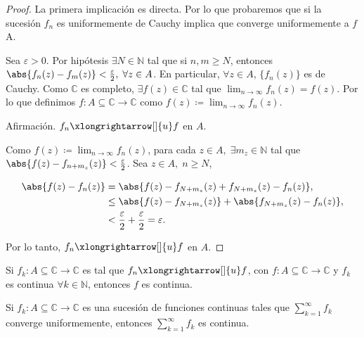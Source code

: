 \documentclass[../main.tex]{subfiles}
\begin{document}
\begin{proof}
    La primera implicación es directa. Por lo que probaremos que si la sucesión
    \(f_{n}\) es uniformemente de Cauchy implica que converge uniformemente a \(f\) A.

    Sea \(\varepsilon > 0\). Por hipótesis \(\exists N\in \mathbb{N}\) tal que si \(n,m
    \geq N\), entonces \(\abs{f_{n}(z) - f_{m}(z)} <
        \tfrac{\varepsilon}{2},\; \forall z\in
    A\).
    En particular, \(\forall z\in A\), \(\{f_{n}(z)\}\) es de Cauchy. Como
    \(\mathbb{C}\) es completo, \(\exists f(z)\in \mathbb{C}\) tal que \(\lim_{n \to
    \infty} f_{n}(z) = f(z)\). Por lo que definimos \(f \colon A \subseteq \mathbb{C}
    \to \mathbb{C}\) como \(f(z) \coloneqq \lim_{n \to \infty} f_{n}(z)\).

    \textcolor{JungleGreen}{Afirmación.} \(f_{n}
    \xlongrightarrow[]{u} f\) en \(A\).

    Como \(f(z) \coloneqq \lim_{n \to \infty} f_{n}(z)\), para cada \(z\in A,\; \exists
    m_{z}\in \mathbb{N}\) tal que \(\abs{f(z) - f_{n + m_{z}}(z)} <
    \tfrac{\varepsilon}{2}\).
    Sea \(z\in A,\; n \geq N\),

    \begin{align*}
        \abs{f(z) - f_{n}(z)} &= \abs{f(z) - f_{N + m_{z}}(z) + f_{N + m_{z}}(z) -
        f_{n}(z)},\\
        &\leq \abs{f(z) - f_{N + m_{z}}(z)} + \abs{f_{N + m_{z}}(z) -
        f_{n}(z)},\\
        &< \dfrac{\varepsilon}{2} + \dfrac{\varepsilon}{2} =
        \varepsilon.
    \end{align*}

    Por lo tanto, \(f_{n} \xlongrightarrow[]{u} f \) en \(A\).
\end{proof}

\begin{remark}
    Si \(f_{k} \colon A \subseteq \mathbb{C} \to \mathbb{C}\) es tal que \(f_{n}
    \xlongrightarrow[]{u} f\), con \(f \colon A \subseteq \mathbb{C} \to \mathbb{C}\) y
    \(f_{k}\) es continua \(\forall k\in \mathbb{N}\), entonces \(f\) es continua.
\end{remark}

\begin{corollary}
    Si \(f_{k} \colon A \subseteq \mathbb{C} \to \mathbb{C}\) es una sucesión de
    funciones continuas tales que \(\sum_{k = 1}^{\infty}f_{k}\) converge uniformemente,
    entonces \(\sum_{k = 1}^{\infty}f_{k}\) es continua.
\end{corollary}
\end{document}
